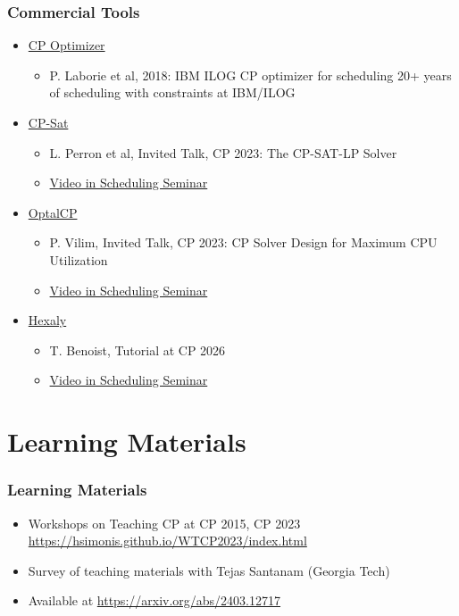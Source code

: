 \begin{frame}
\frametitle{Commercial Tools}
\begin{itemize}
\item \href{https://ibm.com}{CP Optimizer}
\begin{itemize}
\item P. Laborie et al, 2018: IBM ILOG CP optimizer for scheduling
20+ years of scheduling with constraints at IBM/ILOG
\end{itemize}

\item \href{https://developers.google.com}{CP-Sat}
\begin{itemize}
\item L. Perron et al, Invited Talk, CP 2023: The CP-SAT-LP Solver
\item \href{https://www.youtube.com/embed/vvUxusrUcpU?si=ldUAKR6WqdfAIrhL}{Video in Scheduling Seminar}
\end{itemize}

\item \href{https://optalcp.com}{OptalCP}
\begin{itemize}
\item P. Vilim, Invited Talk, CP 2023: CP Solver Design for Maximum CPU Utilization
\item \href{https://www.youtube.com/embed/1Dm-kY3ekKo?si=wn34td-NrpOxknB4}{Video in Scheduling Seminar}
\end{itemize}

\item \href{https://hexaly.com}{Hexaly}
\begin{itemize}
\item T. Benoist, Tutorial at CP 2026
\item \href{https://www.youtube.com/embed/VjB5FoaFFUM?si=27yxZJAfkEBroxZf}{Video in Scheduling Seminar}
\end{itemize}
\end{itemize}
\end{frame}

\section{Learning Materials}

\begin{frame}
\frametitle{Learning Materials}
\begin{itemize}
\item Workshops on Teaching CP at CP 2015, CP 2023 \url{https://hsimonis.github.io/WTCP2023/index.html}
\item Survey of teaching materials with Tejas Santanam (Georgia Tech)
\item Available at \url{https://arxiv.org/abs/2403.12717}
\end{itemize}
\end{frame}

